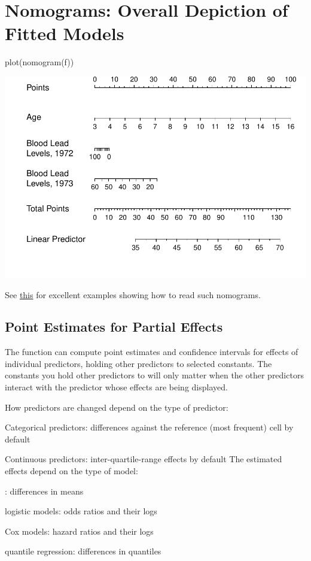\section{Nomograms: Overall Depiction of Fitted Models} \ipacue
\begin{Schunk}
\begin{Sinput}
plot(nomogram(f))
\end{Sinput}


\centerline{\includegraphics[width=\maxwidth]{rmsintro-unnamed-chunk-17-1} }

\end{Schunk}
See \href{http://stats.stackexchange.com/questions/155430/clarifications-regarding-reading-a-nomogram}{this}
for excellent examples showing how to read such nomograms.

\subsection{Point Estimates for Partial Effects} \ipacue
The  function can compute point estimates and confidence
intervals for effects of individual predictors, holding other
predictors to selected constants.  The constants you hold other
predictors to will only matter when the other predictors interact with
the predictor whose effects are being displayed.

How predictors are changed depend on the type of predictor:
\bi
\item Categorical predictors: differences against the reference (most
  frequent) cell by default
\item Continuous predictors: inter-quartile-range effects by default
\ei
The estimated effects depend on the type of model:
\bi
\item {}: differences in means
\item logistic models: odds ratios and their logs
\item Cox models: hazard ratios and their logs
\item quantile regression: differences in quantiles
\ei

